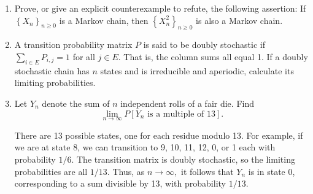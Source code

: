 \documentclass{article}
\begin{document}
\begin{enumerate}
\begin{enumerate}[(a)]
			\item What can you say about the asymptotic behavior of the chain?
				\begin{soln}
					Suppose there is a limiting distribution $\lambda,$ so that
					\[\begin{bmatrix}
							\lambda_1 & \lambda_2 & \lambda_3 & \lambda_4 & \lambda_5
						\end{bmatrix} \begin{bmatrix}
							0.4 & 0.5 & 0.1 & 0 & 0 \\
							0 & 0.3 & 0.2 & 0.5 & 0 \\
							0 & 1 & 0 & 0 & 0 \\
							1 & 0 & 0 & 0 & 0 \\
							0.3 & 0.7 & 0 & 0 & 0
						\end{bmatrix} &= \begin{bmatrix}
							\lambda_1 & \lambda_2 & \lambda_3 & \lambda_4 & \lambda_5
					\end{bmatrix}\]
					Solving, we have 
					\[\begin{bmatrix}
							\lambda_1 & \lambda_2 & \lambda_3 & \lambda_4 & \lambda_5
						\end{bmatrix} = \begin{bmatrix}
							\frac{50}{157} & \frac{60}{157} & \frac{17}{157} & \frac{30}{157} & 0
					\end{bmatrix}\]
					which is the asymptotic behavior.
				\end{soln}

		\end{enumerate}

	\item Prove, or give an explicit counterexample to refute, the following assertion: If $\left\{ X_n \right\}_{n\ge0}$ is a Markov chain, then $\left\{ X_n^2 \right\}_{n\ge0}$ is also a Markov chain.

	\item A transition probability matrix $P$ is said to be doubly stochastic if $\displaystyle\sum_{i\in E}^{} P_{i, j}= 1$ for all $j\in E.$ That is, the column sums all equal 1. If a doubly stochastic chain has $n$ states and is irreducible and aperiodic, calculate its limiting probabilities.

	\item Let $Y_n$ denote the sum of $n$ independent rolls of a fair die. Find
		\[\lim_{n\to\infty} P[Y_n\text{ is a multiple of 13}].\]
		\begin{soln}
			There are 13 possible states, one for each residue modulo 13. For example, if we are at state 8, we can transition to 9, 10, 11, 12, 0, or 1 each with probability $1/6.$ The transition matrix is doubly stochastic, so the limiting probabilities are all $1/13.$ Thus, as $n\to\infty,$ it follows that $Y_n$ is in state 0, corresponding to a sum divisible by 13, with probability $1/13.$
		\end{soln}


\end{enumerate}
\end{document}

